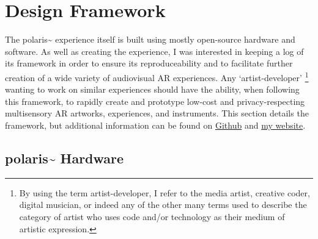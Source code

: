 


\section{Design Framework}\label{sec: polaris-framework}
The polaris\textasciitilde{} experience itself is built using mostly open-source hardware and software. As well as creating the experience, I was interested in keeping a log of its framework in order to ensure its reproduceability and to facilitate further creation of a wide variety of audiovisual AR experiences. Any ‘artist-developer’ \footnote{By using the term artist-developer, I refer to the media artist, creative coder, digital musician, or indeed any of the other many terms used to describe the category of artist who uses code and/or technology as their medium of artistic expression.} wanting to work on similar experiences should have the ability, when following this framework, to rapidly create and prototype low-cost and privacy-respecting multisensory AR artworks, experiences, and instruments. This section details the framework, but additional information can be found on \href{https://github.com/sambilbow/polaris}{Github} and \href{https://sambilbow.com}{my website}.

\subsection{polaris\textasciitilde{} Hardware}\label{sec: polaris-framework-hardware}
